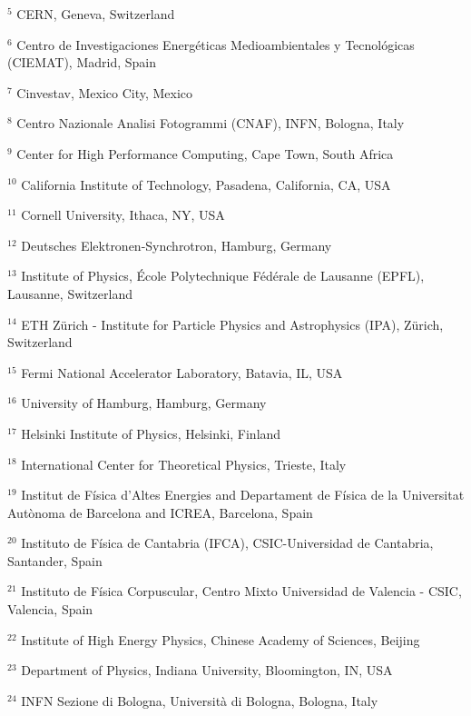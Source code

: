 \par {\footnotesize $^{5}$ CERN, Geneva, Switzerland}
\par {\footnotesize $^{6}$ Centro de Investigaciones Energéticas Medioambientales y Tecnológicas (CIEMAT), Madrid, Spain}
\par {\footnotesize $^{7}$ Cinvestav, Mexico City, Mexico}
\par {\footnotesize $^{8}$ Centro Nazionale Analisi Fotogrammi (CNAF), INFN, Bologna, Italy}
\par {\footnotesize $^{9}$ Center for High Performance Computing, Cape Town, South Africa}
\par {\footnotesize $^{10}$ California Institute of Technology, Pasadena, California, CA, USA}
\par {\footnotesize $^{11}$ Cornell University, Ithaca, NY, USA}
\par {\footnotesize $^{12}$ Deutsches Elektronen-Synchrotron, Hamburg, Germany}
\par {\footnotesize $^{13}$ Institute of Physics, École Polytechnique Fédérale de Lausanne (EPFL), Lausanne, Switzerland}
\par {\footnotesize $^{14}$ ETH Zürich - Institute for Particle Physics and Astrophysics (IPA), Zürich, Switzerland}
\par {\footnotesize $^{15}$ Fermi National Accelerator Laboratory, Batavia, IL, USA}
\par {\footnotesize $^{16}$ University of Hamburg, Hamburg, Germany}
\par {\footnotesize $^{17}$ Helsinki Institute of Physics, Helsinki, Finland}
\par {\footnotesize $^{18}$ International Center for Theoretical Physics, Trieste, Italy}
\par {\footnotesize $^{19}$ Institut de Física d’Altes Energies and Departament de Física de la Universitat Autònoma de Barcelona and ICREA, Barcelona, Spain}
\par {\footnotesize $^{20}$ Instituto de Física de Cantabria (IFCA), CSIC-Universidad de Cantabria, Santander, Spain}
\par {\footnotesize $^{21}$ Instituto de Física Corpuscular, Centro Mixto Universidad de Valencia - CSIC, Valencia, Spain}
\par {\footnotesize $^{22}$ Institute of High Energy Physics, Chinese Academy of Sciences, Beijing}
\par {\footnotesize $^{23}$ Department of Physics, Indiana University, Bloomington, IN, USA}
\par {\footnotesize $^{24}$ INFN Sezione di Bologna, Università di Bologna, Bologna, Italy}
